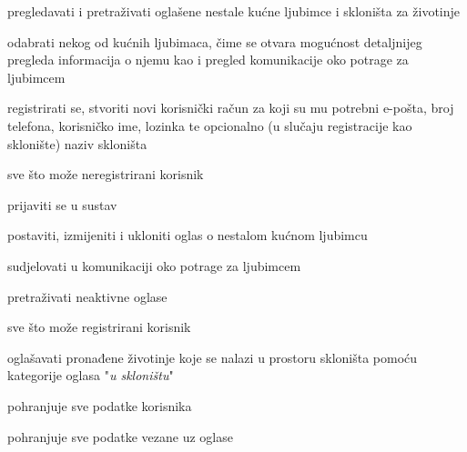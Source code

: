 			
			\begin{packed_enum}
				\item  {}
				
				\begin{packed_enum}
					
					\item pregledavati i pretraživati oglašene nestale kućne ljubimce i skloništa za životinje
					\item odabrati nekog od kućnih ljubimaca, čime se otvara mogućnost detaljnijeg pregleda informacija o njemu kao i pregled komunikacije oko potrage za ljubimcem
					\item registrirati se, stvoriti novi korisnički račun za koji su mu potrebni e-pošta, broj telefona, korisničko ime, lozinka te opcionalno (u slučaju registracije kao sklonište) naziv skloništa
					
				\end{packed_enum}
			
				\item  {}
				
				\begin{packed_enum}
					
					\item sve što može neregistrirani korisnik
					\item prijaviti se u sustav
					\item postaviti, izmijeniti i ukloniti oglas o nestalom kućnom ljubimcu
					\item sudjelovati u komunikaciji oko potrage za ljubimcem
					\item pretraživati neaktivne oglase
					
				\end{packed_enum}
			
			\item  {}
				
				\begin{packed_enum}
				
					\item sve što može registrirani korisnik
					\item oglašavati pronađene životinje koje se nalazi u prostoru skloništa pomoću kategorije oglasa "\textit{u skloništu}"
					
				\end{packed_enum}
			
			\item  {}
				
				\begin{packed_enum}
					
					\item pohranjuje sve podatke korisnika
					\item pohranjuje sve podatke vezane uz oglase
					
				\end{packed_enum}
			\end{packed_enum}
			
